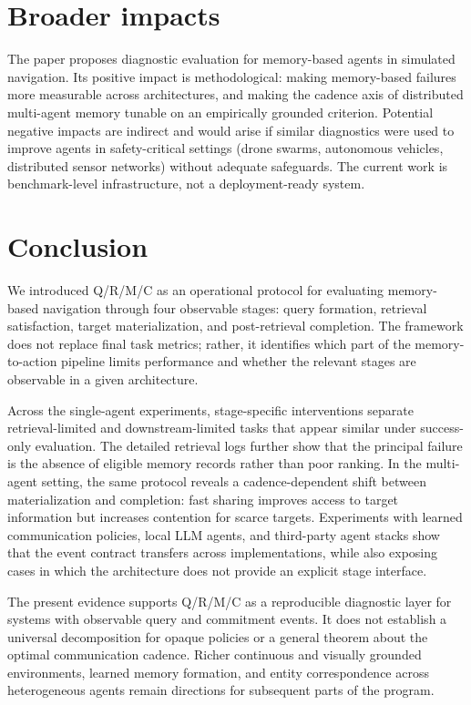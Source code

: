 \documentclass{article}
\begin{document}
\section{Broader impacts}

The paper proposes diagnostic evaluation for memory-based agents in simulated navigation. Its positive impact is methodological: making memory-based failures more measurable across architectures, and making the cadence axis of distributed multi-agent memory tunable on an empirically grounded criterion. Potential negative impacts are indirect and would arise if similar diagnostics were used to improve agents in safety-critical settings (drone swarms, autonomous vehicles, distributed sensor networks) without adequate safeguards. The current work is benchmark-level infrastructure, not a deployment-ready system.

\section{Conclusion}

We introduced Q/R/M/C as an operational protocol for evaluating
memory-based navigation through four observable stages: query
formation, retrieval satisfaction, target materialization, and
post-retrieval completion. The framework does not replace final task
metrics; rather, it identifies which part of the memory-to-action
pipeline limits performance and whether the relevant stages are
observable in a given architecture.

Across the single-agent experiments, stage-specific interventions
separate retrieval-limited and downstream-limited tasks that appear
similar under success-only evaluation. The detailed retrieval logs
further show that the principal failure is the absence of eligible
memory records rather than poor ranking. In the multi-agent setting,
the same protocol reveals a cadence-dependent shift between
materialization and completion: fast sharing improves access to target
information but increases contention for scarce targets. Experiments
with learned communication policies, local LLM agents, and
third-party agent stacks show that the event contract transfers across
implementations, while also exposing cases in which the architecture
does not provide an explicit stage interface.

The present evidence supports Q/R/M/C as a reproducible diagnostic
layer for systems with observable query and commitment events. It does
not establish a universal decomposition for opaque policies or a
general theorem about the optimal communication cadence. Richer
continuous and visually grounded environments, learned memory
formation, and entity correspondence across heterogeneous agents
remain directions for subsequent parts of the program.
\end{document}
